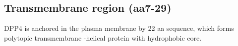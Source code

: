 \subsection{Transmembrane region (aa7-29)}

DPP4 is anchored in the plasma membrane by 22 aa sequence, which forms polytopic transmembrane \alpha-helical protein with hydrophobic core.~\cite{Hong_1990}